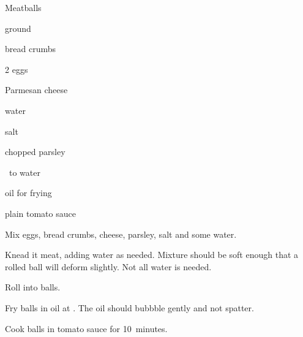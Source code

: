 \begin{recipe}{Meatballs}{}{}

\begin{ingredients}
\item {} ground 
\item {} bread crumbs
\item 2 eggs
\item {} Parmesan cheese
\item {} water
\item {} salt
\item chopped parsley
\item \quarter\ to \C{\half} water
\item oil for frying
\item plain tomato sauce
\end{ingredients}

\begin{directions}
\item Mix eggs, bread crumbs, cheese, parsley, salt and some water.
\item Knead it meat, adding water as needed. Mixture should be soft enough that a rolled ball will deform slightly. Not all water is needed.
\item Roll into balls.
\item Fry balls in oil at . The oil should bubbble gently and not spatter.
\item Cook balls in tomato sauce for 10~minutes.
\end{directions}

\end{recipe}
